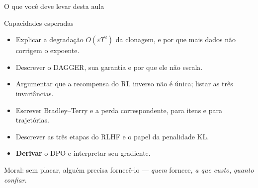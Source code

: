 \documentclass[aspectratio=169, 11pt]{beamer}
\begin{document}
\begin{frame}{O que você deve levar desta aula}

  \begin{defbox}[fontupper=\small]{Capacidades esperadas}
    \begin{itemize}\setlength{\itemsep}{0ex}
      \item Explicar a degradação $O(\varepsilon T^2)$ da clonagem, e por que
        mais dados não corrigem o expoente.
      \item Descrever o DAGGER, sua garantia e por que ele não escala.
      \item Argumentar que a recompensa do RL inverso não é única; listar as
        três invariâncias.
      \item Escrever Bradley--Terry e a perda correspondente, para itens e para
        trajetórias.
      \item Descrever as três etapas do RLHF e o papel da penalidade KL.
      \item \textbf{Derivar} o DPO e interpretar seu gradiente.
    \end{itemize}
  \end{defbox}

  \begin{ideiabox}
    Moral: sem placar, alguém precisa fornecê-lo --- \emph{quem} fornece,
    \emph{a que custo}, \emph{quanto confiar}.
  \end{ideiabox}
\end{frame}
\end{document}

